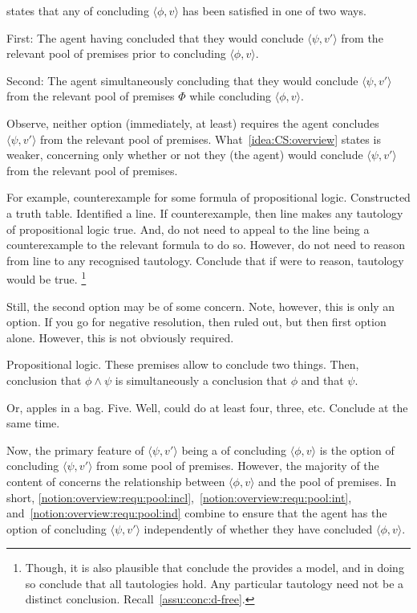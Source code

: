 \begin{note}
   states that any \requ{} of concluding \(\langle \phi,v \rangle\) has been satisfied in one of two ways.

  First:
  The agent having concluded that they would conclude \(\langle \psi,v' \rangle\) from the relevant pool of premises prior to concluding \(\langle \phi,v \rangle\).

  Second:
  The agent simultaneously concluding that they would conclude \(\langle \psi, v' \rangle\) from the relevant pool of premises \(\Phi\) while concluding \(\langle \phi,v \rangle\).

  Observe, neither option (immediately, at least) requires the agent concludes \(\langle \psi,v' \rangle\) from the relevant pool of premises.
  What~\autoref{idea:CS:overview} states is weaker, concerning only whether or not they (the agent) would conclude \(\langle \psi,v' \rangle\) from the relevant pool of premises.

  For example, counterexample for some formula of propositional logic.
  Constructed a truth table.
  Identified a line.
  If counterexample, then line makes any tautology of propositional logic true.
  And, do not need to appeal to the line being a counterexample to the relevant formula to do so.
  However, do not need to reason from line to any recognised tautology.
  Conclude that if were to reason, tautology would be true.\nolinebreak
  \footnote{
    Though, it is also plausible that conclude the provides a model, and in doing so conclude that all tautologies hold.
    Any particular tautology need not be a distinct conclusion.
    Recall~\autoref{assu:conc:d-free}.
  }
\end{note}

\begin{note}
  Still, the second option may be of some concern.
  Note, however, this is only an option.
  If you go for negative resolution, then ruled out, but then first option alone.
  However, this is not obviously required.

  Propositional logic.
  These premises allow to conclude two things.
  Then, conclusion that \(\phi \land \psi\) is simultaneously a conclusion that \(\phi\) and that \(\psi\).

  Or, apples in a bag.
  Five.
  Well, could do at least four, three, etc.
  Conclude at the same time.
\end{note}

\begin{note}[\requ{1}]
  Now, the primary feature of \(\langle \psi,v' \rangle\) being a \requ{} of concluding \(\langle \phi,v \rangle\) is the option of concluding \(\langle \psi,v' \rangle\) from some pool of premises.
  However, the majority of the content of \label{idea:CS:overview:requ} concerns the relationship between \(\langle \phi,v \rangle\) and the pool of premises.
  In short, \autoref{notion:overview:requ:pool:incl},~\autoref{notion:overview:requ:pool:int}, and~\autoref{notion:overview:requ:pool:ind} combine to ensure that the agent has the option of concluding \(\langle \psi,v' \rangle\) independently of whether they have concluded \(\langle \phi,v \rangle\).
\end{note}


